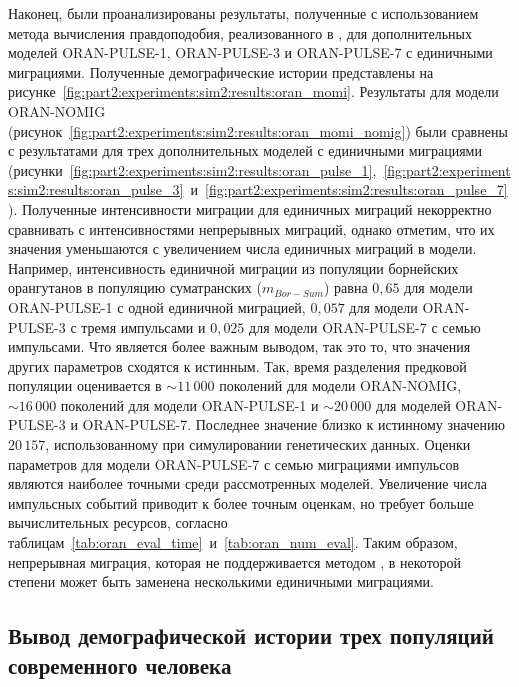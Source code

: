 Наконец, были проанализированы результаты, полученные с использованием метода вычисления правдоподобия, реализованного в \momi, для дополнительных моделей ORAN-PULSE-1, ORAN-PULSE-3 и ORAN-PULSE-7 с единичными миграциями.
Полученные демографические истории представлены на рисунке~\ref{fig:part2:experiments:sim2:results:oran_momi}.
Результаты для модели ORAN-NOMIG (рисунок~\ref{fig:part2:experiments:sim2:results:oran_momi_nomig}) были сравнены с результатами для трех дополнительных моделей с единичными миграциями (рисунки~\ref{fig:part2:experiments:sim2:results:oran_pulse_1},~\ref{fig:part2:experiments:sim2:results:oran_pulse_3}~и~\ref{fig:part2:experiments:sim2:results:oran_pulse_7}).
Полученные интенсивности миграции для единичных миграций некорректно сравнивать с интенсивностями непрерывных миграций, однако отметим, что их значения уменьшаются с увеличением числа единичных миграций в модели.
Например, интенсивность единичной миграции из популяции борнейских орангутанов в популяцию суматранских ($m_{Bor-Sum}$) равна $0{,}65$ для модели ORAN-PULSE-1 с одной единичной миграцией, $0{,}057$ для модели ORAN-PULSE-3 с тремя импульсами и $0{,}025$ для модели ORAN-PULSE-7 с семью импульсами.
Что является более важным выводом, так это то, что значения других параметров сходятся к истинным. 
Так, время разделения предковой популяции оценивается в ${\sim}11{\,}000$ поколений для модели ORAN-NOMIG, ${\sim}16{\,}000$ поколений для модели ORAN-PULSE-1 и ${\sim}20{\,}000$ для моделей ORAN-PULSE-3 и ORAN-PULSE-7.
Последнее значение близко к истинному значению $20{\,}157$, использованному при симулировании генетических данных.
Оценки параметров для модели ORAN-PULSE-7 с семью миграциями импульсов являются наиболее точными среди рассмотренных моделей.
Увеличение числа импульсных событий приводит к более точным оценкам, но требует больше вычислительных ресурсов, согласно таблицам~\ref{tab:oran_eval_time}~и~\ref{tab:oran_num_eval}.
Таким образом, непрерывная миграция, которая не поддерживается методом \momi, в некоторой степени может быть заменена несколькими единичными миграциями.

\FloatBarrier
\subsection{Вывод демографической истории трех популяций современного человека}

